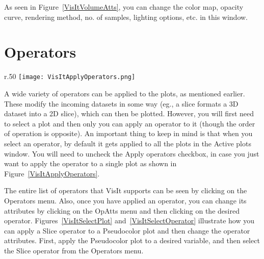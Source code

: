 As seen in Figure~\ref{VisItVolumeAtts}, you can change the color map,
opacity curve, rendering method, no. of samples, lighting options,
etc. in this window.



\section{Operators}

\begin{wrapfigure}{r}{.50\textwidth}
  \vspace{-20pt}
  \center
  \texttt{[image: VisItApplyOperators.png]}
  \vspace{-10pt}
  \caption{Unchecking "selection to all plots"}
  \vspace{-10pt}
  \label{VisItApplyOperators}
\end{wrapfigure}


A wide variety of operators can be applied to the plots, as mentioned
earlier. These modify the incoming datasets in some way (eg., a slice
formats a 3D dataset into a 2D slice), which can then be
plotted. However, you will first need to select a plot and then only
you can apply an operator to it (though the order of operation is
opposite). An important thing to keep in mind is that when you select
an operator, by default it gets applied to all the plots in the Active
plots window. You will need to uncheck the Apply operators checkbox,
in case you just want to apply the operator to a single plot as shown
in Figure~\ref{VisItApplyOperators}.


The entire list of operators that VisIt supports can be seen by
clicking on the Operators menu. Also, once you have applied an
operator, you can change its attributes by clicking on the OpAtts menu
and then clicking on the desired operator.
Figures~\ref{VisItSelectPlot} and~\ref{VisItSelectOperator} illustrate
how you can apply a Slice operator to a Pseudocolor plot and then
change the operator attributes.  First, apply the Pseudocolor plot to
a desired variable, and then select the Slice operator from the
Operators menu.



